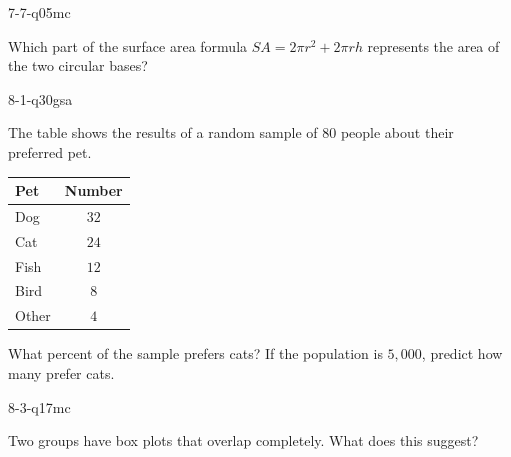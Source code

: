 \begin{practiceQuestion}{7-7-q05}{mc}
\begin{questionText}
Which part of the surface area formula $SA = 2\pi r^2 + 2\pi rh$ represents the area of the two circular bases?
\end{questionText}
\end{practiceQuestion}

\begin{practiceQuestion}{8-1-q30}{gsa}
\begin{questionText}
The table shows the results of a random sample of $80$ people about their preferred pet.

\begin{center}
\begin{tabular}{|l|c|}
\hline
\textbf{Pet} & \textbf{Number} \\
\hline
Dog & $32$ \\
\hline
Cat & $24$ \\
\hline
Fish & $12$ \\
\hline
Bird & $8$ \\
\hline
Other & $4$ \\
\hline
\end{tabular}
\end{center}

What percent of the sample prefers cats? If the population is $5{,}000$, predict how many prefer cats.
\end{questionText}
\end{practiceQuestion}

\begin{practiceQuestion}{8-3-q17}{mc}
\begin{questionText}
Two groups have box plots that overlap completely. What does this suggest?
\end{questionText}
\end{practiceQuestion}

